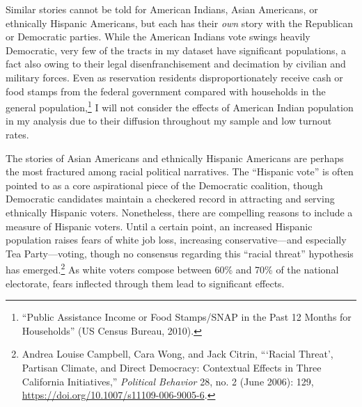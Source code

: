 \documentclass[12pt,oneside]{psthesis}
\begin{document}
Similar stories cannot be told for American Indians, Asian Americans, or ethnically Hispanic Americans, but each has their \emph{own} story with the Republican or Democratic parties.
While the American Indians vote swings heavily Democratic, very few of the tracts in my dataset have significant populations, a fact also owing to their legal disenfranchisement and decimation by civilian and military forces.
Even as reservation residents disproportionately receive cash or food stamps from the federal government compared with households in the general population,\footnote{``Public Assistance Income or Food Stamps/SNAP in the Past 12 Months for Households'' (US Census Bureau, 2010).} I will not consider the effects of American Indian population in my analysis due to their diffusion throughout my sample and low turnout rates.

The stories of Asian Americans and ethnically Hispanic Americans are perhaps the most fractured among racial political narratives.
The ``Hispanic vote'' is often pointed to as a core aspirational piece of the Democratic coalition, though Democratic candidates maintain a checkered record in attracting and serving ethnically Hispanic voters.
Nonetheless, there are compelling reasons to include a measure of Hispanic voters.
Until a certain point, an increased Hispanic population raises fears of white job loss, increasing conservative---and especially Tea Party---voting, though no consensus regarding this ``racial threat'' hypothesis has emerged.\footnote{Andrea Louise Campbell, Cara Wong, and Jack Citrin, ```Racial Threat', Partisan Climate, and Direct Democracy: Contextual Effects in Three California Initiatives,'' \emph{Political Behavior} 28, no. 2 (June 2006): 129, \url{https://doi.org/10.1007/s11109-006-9005-6}.}
As white voters compose between 60\% and 70\% of the national electorate, fears inflected through them lead to significant effects.
\end{document}
